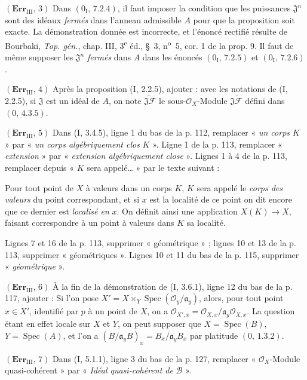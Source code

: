 \noindent\textbf{$(\mathbf{Err}_{\mathrm{III}},\,3)$} Dans
$(0_{\mathrm I},\,7.2.4)$, il faut imposer la condition que les puissances
$\mathfrak J^n$ sont des idéaux \emph{fermés} dans l'anneau admissible $A$ pour
que la proposition soit exacte. La démonstration donnée est incorrecte, et
l'énoncé rectifié résulte de Bourbaki, \emph{Top. gén.}, chap. III,
3\textsuperscript{e} éd., \S~3, n\textsuperscript{o}~5, cor. 1 de la prop. 9.
Il faut de même supposer les $\mathfrak J^n$ \emph{fermés} dans $A$ dans les
énoncés $(0_{\mathrm I},\,7.2.5)$ et $(0_{\mathrm I},\,7.2.6)$.

\noindent\textbf{$(\mathbf{Err}_{\mathrm{III}},\,4)$} Après la proposition
(I, 2.2.5), ajouter : avec les notations de (I, 2.2.5), si $\mathfrak J$ est un
idéal de $A$, on note $\widetilde{\mathfrak J\mathscr F}$ le sous-$\mathscr O_X$-Module
$\mathfrak J\widetilde{\mathscr F}$ défini dans $(0,\,4.3.5)$.

\noindent\textbf{$(\mathbf{Err}_{\mathrm{III}},\,5)$} Dans (I, 3.4.5), ligne 1
du bas de la p. 112, remplacer « \emph{un corps} $K$ » par « \emph{un corps
algébriquement clos} $K$ ». Ligne 1 de la p. 113, remplacer « \emph{extension} »
par « \emph{extension algébriquement close} ». Lignes 1 à 4 de la p. 113,
remplacer depuis « $K$ sera appelé\ldots{} » par le texte suivant :

Pour tout point de $X$ à valeurs dans un corps $K$, $K$ sera appelé le
\emph{corps des valeurs} du point correspondant, et si $x$ est la localité de
ce point on dit encore que ce dernier est \emph{localisé en} $x$. On définit
ainsi une application $X(K)\to X$, faisant correspondre à un point à valeurs
dans $K$ sa localité.

Lignes 7 et 16 de la p. 113, supprimer « géométrique » ; lignes 10 et 13 de
la p. 113, supprimer « géométriques ». Lignes 10 et 11 du bas de la p. 115,
supprimer « \emph{géométrique} ».

\noindent\textbf{$(\mathbf{Err}_{\mathrm{III}},\,6)$} À la fin de la
démonstration de (I, 3.6.1), ligne 12 du bas de la p. 117, ajouter : Si l'on
pose
$X'=X\times_Y\operatorname{Spec}(\mathscr O_y/\mathfrak a_y)$, alors, pour tout
point $x\in X'$, identifié par $p$ à un point de $X$, on a
$\mathscr O_{X',x}=\mathscr O_{X,x}/\mathfrak a_y\mathscr O_{X,x}$. La question
étant en effet locale sur $X$ et $Y$, on peut supposer que
$X=\operatorname{Spec}(B)$, $Y=\operatorname{Spec}(A)$, et l'on a
$(B/\mathfrak a_yB)_x=B_x/\mathfrak a_yB_x$ par platitude $(0,\,1.3.2)$.

\noindent\textbf{$(\mathbf{Err}_{\mathrm{III}},\,7)$} Dans (I, 5.1.1), ligne 3
du bas de la p. 127, remplacer « $\mathscr O_X$-Module quasi-cohérent » par
« \emph{Idéal quasi-cohérent de} $\mathscr B$ ».

